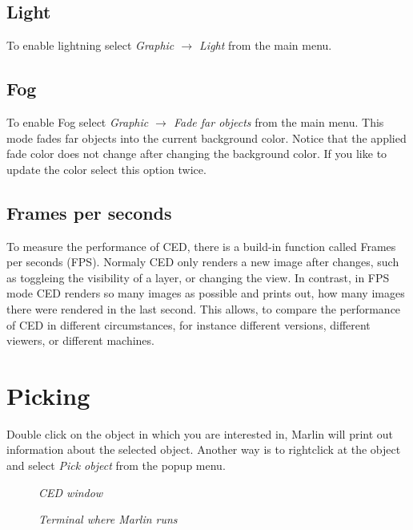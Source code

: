 \documentclass[a4paper,10pt]{article}
\begin{document}
\subsection{Light}
To enable lightning select \textit{Graphic $\to$ Light} from the main menu.

\subsection{Fog}
To enable Fog select \textit{Graphic $\to$ Fade far objects} from the main menu.
This mode fades far objects into the current background color.
Notice that the applied fade color does not change after changing the background color. 
If you like to update the color select this option twice.


\subsection{Frames per seconds}
To measure the performance of CED, there is a build-in function called Frames per seconds (FPS). 
Normaly CED only renders a new image after changes, such as toggleing the visibility of a layer, or changing the view. 
In contrast, in FPS mode CED renders so many images as possible and prints out, how many images there were rendered in the last second. 
This allows, to compare the performance of CED in different circumstances, for instance different versions, different viewers, or different machines. 

\section{Picking}
Double click on the object in which you are interested in, Marlin will print out information about the selected object. 
Another way is to rightclick at the object and select \textit{Pick object} from the popup menu. 

\begin{figure}[h!]
\begin{minipage}[t]{6cm}
\setlength{\fboxsep}{0mm}
\centerline{}
\caption{\label{CEDViewer} \textsl{CED window}}
\end{minipage}
\hfill
\begin{minipage}[t]{6cm}
\setlength{\fboxsep}{0mm}
\centerline{}
\caption{\label{DSTViewer}\textsl{Terminal where Marlin runs}}
\end{minipage}
\end{figure}
 
\end{document}
